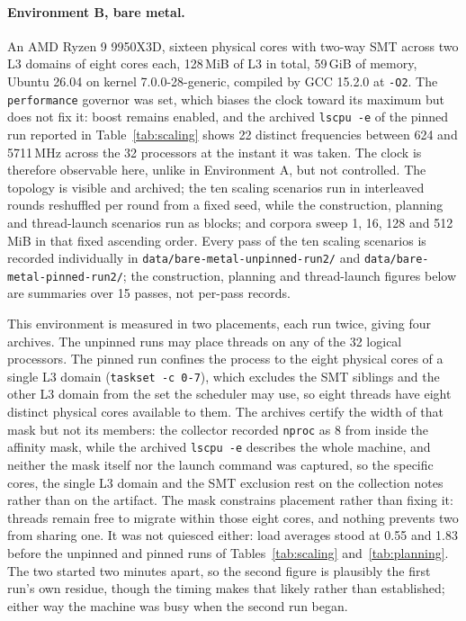 \documentclass[11pt,a4paper]{article}
\theoremstyle{definition}
\theoremstyle{plain}
\newcommand{\code}[1]{\texttt{#1}}
\begin{document}
\paragraph{Environment B, bare metal.} An AMD Ryzen 9 9950X3D, sixteen physical cores with two-way SMT across two L3
domains of eight cores each, 128\,MiB of L3 in total, 59\,GiB of memory, Ubuntu 26.04 on kernel 7.0.0-28-generic,
compiled by GCC 15.2.0 at \code{-O2}. The \code{performance} governor was set, which biases the clock toward its maximum
but does not fix it: boost remains enabled, and the archived \code{lscpu -e} of the pinned run reported in
Table~\ref{tab:scaling} shows 22 distinct frequencies between 624 and 5711\,MHz across the 32 processors at the instant
it was taken. The clock is therefore observable here, unlike in Environment A, but not controlled. The topology is
visible and archived; the ten scaling scenarios run in interleaved rounds reshuffled per round from a fixed seed, while
the construction, planning and thread-launch scenarios run as blocks; and corpora sweep 1, 16, 128 and 512\,MiB in that
fixed ascending order. Every pass of the ten scaling scenarios is recorded individually in
\code{data/bare-metal-unpinned-run2/} and \code{data/bare-metal-pinned-run2/}; the construction, planning and
thread-launch figures below are summaries over 15 passes, not per-pass records.

This environment is measured in two placements, each run twice, giving four archives. The unpinned runs may place
threads on any of the 32 logical processors. The pinned run confines the process to the eight physical cores of a
single L3 domain (\code{taskset -c 0-7}), which excludes the SMT siblings and the other L3 domain from the set the
scheduler may use, so eight threads have eight distinct physical cores available to them. The archives certify the
width of that mask but not its members: the collector recorded \code{nproc} as 8 from inside the affinity mask, while
the archived \code{lscpu -e} describes the whole machine, and neither the mask itself nor the launch command was
captured, so the specific cores, the single L3 domain and the SMT exclusion rest on the collection notes rather than
on the artifact. The mask constrains placement rather than fixing it: threads remain free to migrate within those
eight cores, and nothing prevents two from sharing one. It was not quiesced either: load averages stood at 0.55 and
1.83 before the unpinned and pinned runs of Tables~\ref{tab:scaling} and~\ref{tab:planning}. The two started two
minutes apart, so the second figure is plausibly the first run's own residue, though the timing makes that likely
rather than established; either way the machine was busy when the second run began.
\end{document}
